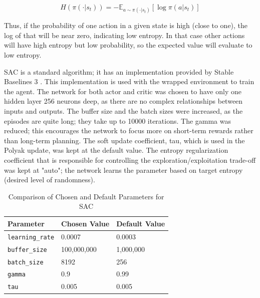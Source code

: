\begin{equation}
H(\pi(\cdot | s_t)) = -\mathbb{E}_{a \sim \pi(\cdot | s_t)} \left[ \log \pi(a | s_t) \right]
\label{eq:sac_entropy}
\end{equation}

\bigskip \noindent
Thus, if the probability of one action in a given state is high (close to one), the log of that will be near zero, indicating low entropy. In that case other actions will have high entropy but low probability, so the expected value will evaluate to low entropy.

\bigskip \noindent
SAC is a standard algorithm; it has an implementation provided by Stable Baselines 3 \cite{stable-baselines3}. This implementation is used with the wrapped environment to train the agent. The network for both actor and critic was chosen to have only one hidden layer 256 neurons deep, as there are no complex relationships between inputs and outputs. The buffer size and the batch sizes were increased, as the episodes are quite long; they take up to 10000 iterations. The gamma was reduced; this encourages the network to focus more on short-term rewards rather than long-term planning. The soft update coefficient, tau, which is used in the Polyak update, was kept at the default value. The entropy regularization coefficient that is responsible for controlling the exploration/exploitation trade-off was kept at "auto"; the network learns the parameter based on target entropy (desired level of randomness).

\begin{table}[ht]

  \centering

  \setlength{\tabcolsep}{0.5em}

  \renewcommand{\arraystretch}{1.2}

  \begin{tabular}{|l|l|l|}

  \hline

  \textbf{Parameter} & \textbf{Chosen Value} & \textbf{Default Value} \\ \hline

  \texttt{learning\_rate} & 0.0007 & 0.0003 \\ \hline

  \texttt{buffer\_size} & 100,000,000 & 1,000,000 \\ \hline

  \texttt{batch\_size} & 8192 & 256 \\ \hline

  \texttt{gamma} & 0.9 & 0.99 \\ \hline

  \texttt{tau} & 0.005 & 0.005 \\ \hline

  \end{tabular}

  \caption{Comparison of Chosen and Default Parameters for SAC}

  \label{tab:sac_params}

\end{table}


